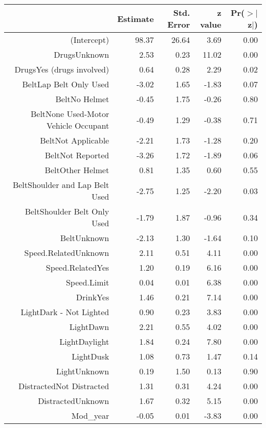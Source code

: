 \begin{table}[ht]
\centering
\begin{tabular}{rrrrr}
  \hline
 & Estimate & Std. Error & z value & Pr($>$$|$z$|$) \\ 
  \hline
(Intercept) & 98.37 & 26.64 & 3.69 & 0.00 \\ 
  DrugsUnknown & 2.53 & 0.23 & 11.02 & 0.00 \\ 
  DrugsYes (drugs involved) & 0.64 & 0.28 & 2.29 & 0.02 \\ 
  BeltLap Belt Only Used & -3.02 & 1.65 & -1.83 & 0.07 \\ 
  BeltNo Helmet & -0.45 & 1.75 & -0.26 & 0.80 \\ 
  BeltNone Used-Motor Vehicle Occupant & -0.49 & 1.29 & -0.38 & 0.71 \\ 
  BeltNot Applicable & -2.21 & 1.73 & -1.28 & 0.20 \\ 
  BeltNot Reported & -3.26 & 1.72 & -1.89 & 0.06 \\ 
  BeltOther Helmet & 0.81 & 1.35 & 0.60 & 0.55 \\ 
  BeltShoulder and Lap Belt Used & -2.75 & 1.25 & -2.20 & 0.03 \\ 
  BeltShoulder Belt Only Used & -1.79 & 1.87 & -0.96 & 0.34 \\ 
  BeltUnknown & -2.13 & 1.30 & -1.64 & 0.10 \\ 
  Speed.RelatedUnknown & 2.11 & 0.51 & 4.11 & 0.00 \\ 
  Speed.RelatedYes & 1.20 & 0.19 & 6.16 & 0.00 \\ 
  Speed.Limit & 0.04 & 0.01 & 6.38 & 0.00 \\ 
  DrinkYes & 1.46 & 0.21 & 7.14 & 0.00 \\ 
  LightDark - Not Lighted & 0.90 & 0.23 & 3.83 & 0.00 \\ 
  LightDawn & 2.21 & 0.55 & 4.02 & 0.00 \\ 
  LightDaylight & 1.84 & 0.24 & 7.80 & 0.00 \\ 
  LightDusk & 1.08 & 0.73 & 1.47 & 0.14 \\ 
  LightUnknown & 0.19 & 1.50 & 0.13 & 0.90 \\ 
  DistractedNot Distracted & 1.31 & 0.31 & 4.24 & 0.00 \\ 
  DistractedUnknown & 1.67 & 0.32 & 5.15 & 0.00 \\ 
  Mod\_year & -0.05 & 0.01 & -3.83 & 0.00 \\ 
   \hline
\end{tabular}
\end{table}
